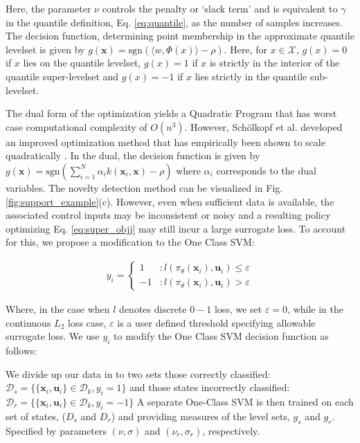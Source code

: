 \documentclass[10pt, conference]{ieeeconf}      %
\newcommand{\bu}{\mathbf{u}}
\newcommand{\bx}{\mathbf{x}}
\begin{document}
Here, the parameter $\nu$ controls the penalty or `slack term' and is equivalent to $\gamma$ \cite{vert2006consistency}
in the quantile definition, Eq. \ref{eq:quantile}, as the number of samples increases. The decision
function, determining point membership in the approximate quantile levelset is given by $g(\bx) = \mbox{sgn}(\langle w,\Phi(x) \rangle-\rho)$. Here, for $x\in \mathcal{X}$, $g(x)=0$ if $x$ lies on the quantile levelset,
$g(x) = 1$ if $x$ is strictly in the interior of the quantile super-levelset and $g(x) = -1$ 
if $x$ lies strictly in the quantile sub-levelset. 



The dual form of the optimization yields a Quadratic Program 
that has worst case computational complexity of $O(n^3)$. However, Sch{\"o}lkopf et al. developed an improved optimization method that has empirically been shown to scale quadratically \cite{scholkopf2001estimating}. In the dual, the decision function is given by $g(\bx) = \mbox{sgn}(\sum^N_{i=1}\alpha_i k(\bx_i,\bx)-\rho)$ where $\alpha_i$ corresponds to the dual variables.  The novelty detection method can be visualized in Fig. \ref{fig:support_example}(c). 
However, even when sufficient data is available, the associated control inputs may be inconsistent or noisy and a resulting policy
optimizing Eq. \ref{eq:super_objj} may still incur a large surrogate loss. To account for this, we propose a
modification to the One Class SVM:

\vspace{-2ex}
\begin{align}
y_i = \left\{
     \begin{array}{lr}
         1 & : l(\pi_{\theta}(\bx_i),\bu_i)\le \varepsilon\\
         -1 & : l(\pi_{\theta}(\bx_i),\bu_i)>\varepsilon
     \end{array}
   \right.
\end{align}

Where, in the case when $l$ denotes discrete $0-1$ loss, we set $\varepsilon = 0$, while in the continuous $L_2$ loss
case, $\varepsilon$ is a user defined threshold specifying allowable surrogate loss.
We use $y_i$ to modify the One Class SVM decision function as follows: 


We divide up our data in to two sets those correctly classified: $\mathcal{D}_{s}=\{\lbrace \bx_i,\bu_i \rbrace \in \mathcal{D}_{k}, y_i=1\}$ and those states incorrectly classified: $\mathcal{D}_{r}=\{\lbrace \bx_i,\bu_i \rbrace \in \mathcal{D}_{k}, y_i=-1\}$
A separate One-Class SVM is then trained on each set of states, ($D_{s}$ and $D_{r}$) and providing measures of the level sets, $g_{s}$ and $g_{r}$. Specified by parameters $(\nu,\sigma)$ and $(\nu_r,\sigma_r)$, respectively. 
\end{document}
